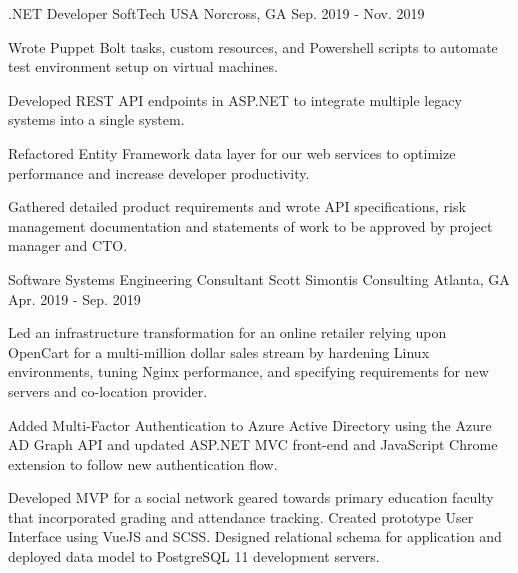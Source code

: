 

\begin{cventries}

  \cventry
    {.NET Developer} %
    {SoftTech USA} %
    {Norcross, GA} %
    {Sep. 2019 - Nov. 2019} %
    {
      \begin{cvitems} %
        \item {Wrote Puppet Bolt tasks, custom resources, and Powershell scripts to automate test environment setup on virtual machines.}
        \item {Developed REST API endpoints in ASP.NET to integrate multiple legacy systems into a single system.}
        \item {Refactored Entity Framework data layer for our web services to optimize performance and increase developer productivity.}
        \item {Gathered detailed product requirements and wrote API specifications, risk management documentation and statements of work to be approved by project manager and CTO.}
      \end{cvitems}
    }

  \cventry
    {Software Systems Engineering Consultant} %
    {Scott Simontis Consulting} %
    {Atlanta, GA} %
    {Apr. 2019 - Sep. 2019} %
    {
      \begin{cvitems} %
        \item {Led an infrastructure transformation for an online retailer relying upon OpenCart for a multi-million dollar sales stream by hardening Linux environments, tuning Nginx performance, and specifying requirements for new servers and co-location provider.}
        \item {Added Multi-Factor Authentication to Azure Active Directory using the Azure AD Graph API and updated ASP.NET MVC front-end and JavaScript Chrome extension to follow new authentication flow.}
        \item {Developed MVP for a social network geared towards primary education faculty that incorporated grading and attendance tracking. Created prototype User Interface using VueJS and SCSS. Designed relational schema for application and deployed data model to PostgreSQL 11 development servers.}
      \end{cvitems}
    }


\end{cventries}
